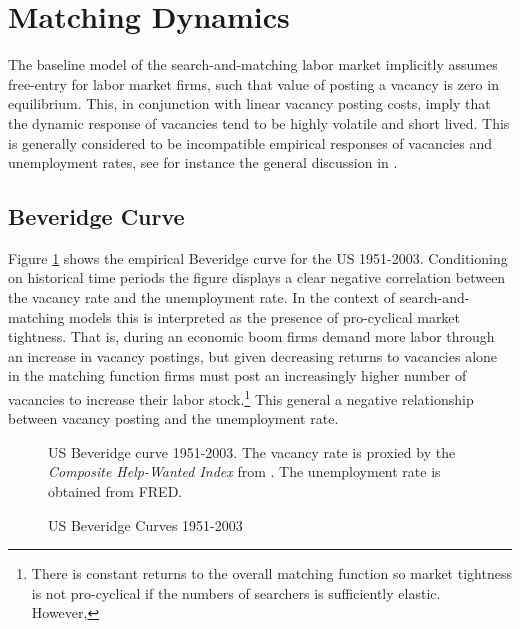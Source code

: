 

\pagebreak 
\section{Matching Dynamics}
The baseline model of the search-and-matching labor market implicitly assumes free-entry for labor market firms, such that value of posting a vacancy is zero in equilibrium. This, in conjunction with linear vacancy posting costs, imply that the dynamic response of vacancies tend to be highly volatile and short lived. This is generally considered to be incompatible empirical responses of vacancies and unemployment rates, see for instance the general discussion in \citet{elsby2015beveridge}.


\subsection{Beveridge Curve}

Figure \ref{fig:Beveridge_cruve_data} shows the empirical Beveridge curve for the US 1951-2003. Conditioning on historical time periods the figure displays a clear negative correlation between the vacancy rate and the unemployment rate. In the context of search-and-matching models this is interpreted as the presence of pro-cyclical market tightness. That is, during an economic boom firms demand more labor through an increase in vacancy postings, but given decreasing returns to vacancies alone in the matching function firms must post an increasingly higher number of vacancies to increase their labor stock.\footnote{There is constant returns to the overall matching function so market tightness is not pro-cyclical if the numbers of searchers is sufficiently elastic. However, } This general a negative relationship between vacancy posting and the unemployment rate.




\begin{figure}[H]
\caption[Caption for LOF]{US Beveridge Curves 1951-2003}
\label{fig:Beveridge_cruve_data}
\centering
  {\scriptsize US Beveridge curve 1951-2003. The vacancy rate is proxied by the \textit{Composite Help-Wanted Index} from \citet{barnichon2010building}. The unemployment rate is obtained from FRED.  }
\end{figure}

